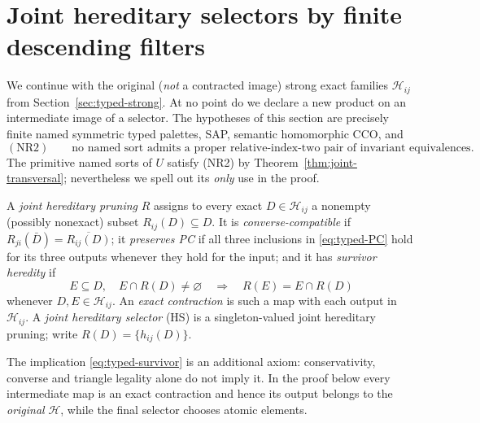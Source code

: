 \section{Joint hereditary selectors by finite descending filters}
\label{sec:typed-selectors}

We continue with the original (\emph{not} a contracted image)
strong exact families $\mathcal H_{ij}$ from
Section~\ref{sec:typed-strong}.  At no point do we declare a new
product on an intermediate image of a selector.  The hypotheses of
this section are precisely finite named symmetric typed palettes,
SAP, semantic homomorphic CCO, and
\begin{equation}\label{eq:NR2}
 (\mathrm{NR2})\qquad
 \text{no named sort admits a proper relative-index-two pair of}
 \text{ invariant equivalences}.
\end{equation}
The primitive named sorts of $U$ satisfy (NR2) by
Theorem~\ref{thm:joint-transversal}; nevertheless we spell out its
\emph{only} use in the proof.

\begin{definition}
\label{def:joint-pruning}
A \emph{joint hereditary pruning} $R$ assigns to every exact
$D\in\mathcal H_{ij}$ a nonempty (possibly nonexact) subset
$R_{ij}(D)\subseteq D$.  It is \emph{converse-compatible} if
$R_{ji}(\bar D)=\overline{R_{ij}(D)}$; it \emph{preserves PC} if
all three inclusions in \eqref{eq:typed-PC} hold for its three
outputs whenever they hold for the input; and it has \emph{survivor
heredity} if
\begin{equation}\label{eq:typed-survivor}
 E\subseteq D,\quad E\cap R(D)\ne\varnothing
 \quad\Longrightarrow\quad R(E)=E\cap R(D)
\end{equation}
whenever $D,E\in\mathcal H_{ij}$.  An \emph{exact contraction} is
such a map with each output in $\mathcal H_{ij}$.  A \emph{joint
hereditary selector} (HS) is a singleton-valued joint hereditary
pruning; write $R(D)=\{h_{ij}(D)\}$.

The implication \eqref{eq:typed-survivor} is an additional axiom:
conservativity, converse and triangle legality alone do not imply
it.  In the proof below every intermediate map is an exact
contraction and hence its output belongs to the \emph{original}
$\mathcal H$, while the final selector chooses atomic elements.
\end{definition}

